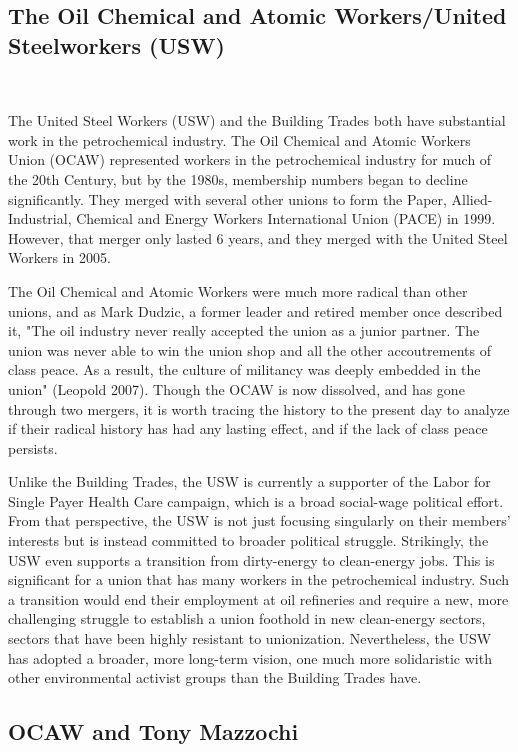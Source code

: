 \documentclass[12pt]{article}
\begin{document}

\subsection{The Oil Chemical and Atomic Workers/United Steelworkers (USW)} \

The United Steel Workers (USW) and the Building Trades both have substantial work in the petrochemical industry. The Oil Chemical and Atomic Workers Union (OCAW) represented workers in the petrochemical industry for much of the 20th Century, but by the 1980s, membership numbers began to decline significantly. They merged with several other unions to form the Paper, Allied-Industrial, Chemical and Energy Workers International Union (PACE) in 1999. However, that merger only lasted 6 years, and they merged with the United Steel Workers in 2005.

The Oil Chemical and Atomic Workers were much more radical than other unions, and as Mark Dudzic, a former leader and retired member once described it, "The oil industry never really accepted the union as a junior partner. The union was never able to win the union shop and all the other accoutrements of class peace. As a result, the culture of militancy was deeply embedded in the union" (Leopold 2007). Though the OCAW is now dissolved, and has gone through two mergers, it is worth tracing the history to the present day to analyze if their radical history has had any lasting effect, and if the lack of class peace persists.

Unlike the Building Trades, the USW is currently a supporter of the Labor for Single Payer Health Care campaign, which is a broad social-wage political effort. From that perspective, the USW is not just focusing singularly on their members’ interests but is instead committed to broader political struggle. Strikingly, the USW even supports a transition from dirty-energy to clean-energy jobs. This is significant for a union that has many workers in the petrochemical industry. Such a transition would end their employment at oil refineries and require a new, more challenging struggle to establish a union foothold in new clean-energy sectors, sectors that have been highly resistant to unionization. Nevertheless, the USW has adopted a broader, more long-term vision, one much more solidaristic with other environmental activist groups than the Building Trades have.

\subsection{OCAW and Tony Mazzochi}
\end{document}
